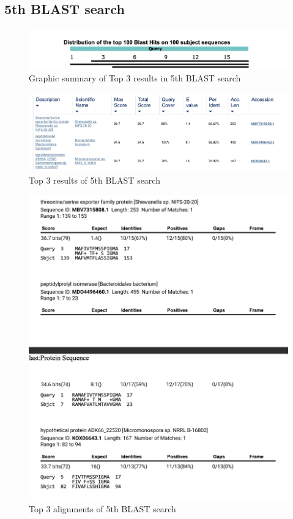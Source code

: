\documentclass[a4paper,english,12pt,bibliography=totoc]{scrreprt}
\begin{document}
\subsection{5th BLAST search}

\begin{figure}[H]
    \centering
    \includegraphics[width=0.9\linewidth]{Project 1/5th images/graphic summary 5.png}
    \caption{Graphic summary of Top 3 results in 5th BLAST search}
    \label{fig:enter-label}
\end{figure}



\begin{figure}[H]
    \centering
    \includegraphics[width=0.9\linewidth]{Project 1/5th images/Blast results 5.png}
    \caption{Top 3 results of 5th BLAST search}
    \label{fig:enter-label}
\end{figure}



\begin{figure}[H]
    \centering
    \includegraphics[width=0.9\linewidth]{Project 1/5th images/alignments 5.png}
    \caption{Top 3 alignments of 5th BLAST search}
    \label{fig:enter-label}
\end{figure}
\end{document}
